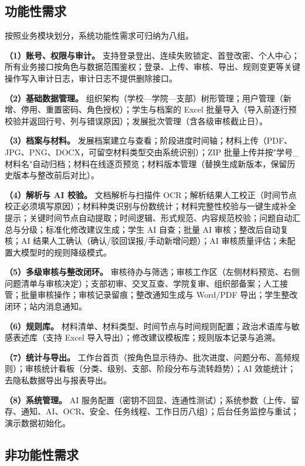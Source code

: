 \documentclass[12pt,a4paper]{ctexart}
\begin{document}
\subsection{功能性需求}

按照业务模块划分，系统功能性需求可归纳为八组。

\textbf{（1）账号、权限与审计。} 支持登录登出、连续失败锁定、首登改密、个人中心；所有业务接口按角色与数据范围鉴权；登录、上传、审核、导出、规则变更等关键操作写入审计日志，审计日志不提供删除接口。

\textbf{（2）基础数据管理。} 组织架构（学校—学院—支部）树形管理；用户管理（新增、停用、重置密码、角色授权）；学生与档案的 Excel 批量导入（导入前逐行预校验并返回行号、列与错误原因）；发展批次管理（含各级审核截止日）。

\textbf{（3）档案与材料。} 发展档案建立与查看；阶段进度时间轴；材料上传（PDF、JPG、PNG、DOCX，可留空材料类型交由系统识别）；ZIP 批量上传并按"学号\_材料名"自动归档；材料在线逐页预览；材料版本管理（替换生成新版本，保留历史版本与整改前后对比）。

\textbf{（4）解析与 AI 校验。} 文档解析与扫描件 OCR；解析结果人工校正（时间节点校正必须填写原因）；材料种类识别与份数统计；材料完整性校验与一键生成补全提示；关键时间节点自动提取；时间逻辑、形式规范、内容规范校验；问题自动汇总与分级；标准化修改建议生成；学生 AI 自查；批量 AI 审核；整改后自动复核；AI 结果人工确认（确认/驳回误报/手动新增问题）；AI 审核质量评估；未配置大模型时的规则降级模式。

\textbf{（5）多级审核与整改闭环。} 审核待办与筛选；审核工作区（左侧材料预览、右侧问题清单与审核决定）；支部初审、交叉互查、学院复审、组织部备案；人工接管；批量审核操作；审核记录留痕；整改通知生成与 Word/PDF 导出；学生整改闭环；站内消息通知。

\textbf{（6）规则库。} 材料清单、材料类型、时间节点与时间规则配置；政治术语库与敏感表述库（支持 Excel 导入导出）；修改建议模板库；规则版本记录与追溯。

\textbf{（7）统计与导出。} 工作台首页（按角色显示待办、批次进度、问题分布、高频规则）；审核统计看板（分类、级别、支部、阶段分布与流转趋势）；AI 效能统计；去隐私数据导出与报表导出。

\textbf{（8）系统管理。} AI 服务配置（密钥不回显、连通性测试）；系统参数（上传、留存、通知、AI、OCR、安全、任务线程、工作日历八组）；后台任务监控与重试；演示数据初始化。

\subsection{非功能性需求}
\end{document}
